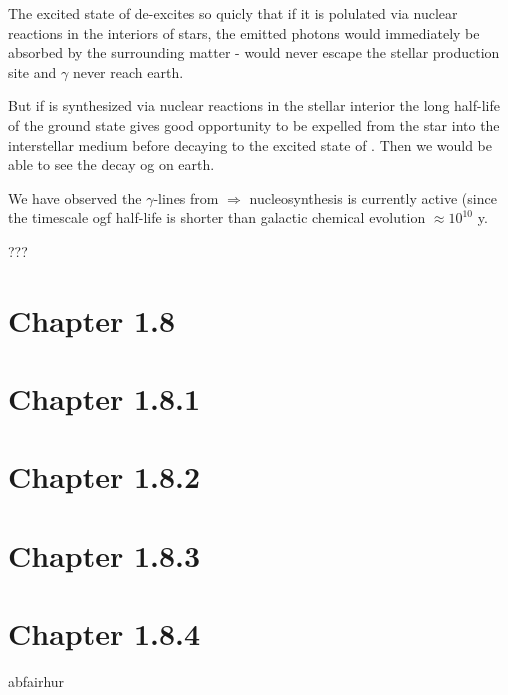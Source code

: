 \documentclass[a4paper,12pt]{article}
\begin{document}
The excited state of  de-excites so quicly that if it is polulated via nuclear reactions in the interiors of stars, the emitted photons would immediately be absorbed by the surrounding matter - would never escape the stellar production site and $\gamma$ never reach earth.

But if  is synthesized via nuclear reactions in the stellar interior the long half-life of the ground state gives good opportunity to be expelled from the star into the interstellar medium before decaying to the excited state of . Then we would be able to see the decay og  on earth. 

We have observed the $\gamma$-lines from  $\Rightarrow$ nucleosynthesis is currently active (since the timescale ogf  half-life is shorter than galactic chemical evolution $\approx 10^10$ y.

???



\section*{Chapter 1.8}
\section*{Chapter 1.8.1}
\section*{Chapter 1.8.2}
\section*{Chapter 1.8.3}



\section*{Chapter 1.8.4}






abfairhur


\end{document}
